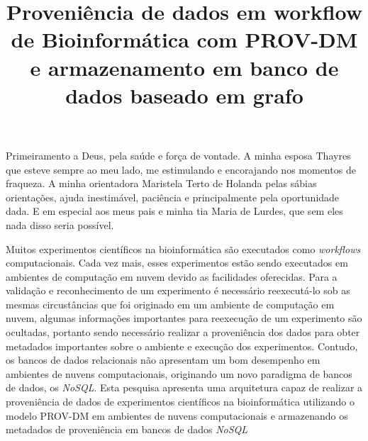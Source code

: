 \documentclass[mestrado]{unb-cic}
\title{Proveniência de dados em workflow de Bioinformática
  com PROV-DM e armazenamento em banco de dados baseado em grafo}
\begin{document}
\maketitle

\pretextual

\begin{agradecimentos}
Primeiramento a Deus, pela saúde e força de vontade. A minha esposa
Thayres que esteve sempre ao meu lado, me estimulando e encorajando
nos momentos de fraqueza. A minha orientadora \prof[a] \dr[a]
Maristela Terto de Holanda pelas sábias orientações, ajuda
inestimável, paciência e principalmente pela oportunidade
dada. E em especial aos meus pais e minha tia Maria de Lurdes, que sem
eles nada disso seria possível.

\end{agradecimentos}

\begin{resumo}
Muitos experimentos científicos na bioinformática são executados como
\textit{workflows} computacionais. Cada vez mais, esses experimentos estão sendo
executados em ambientes de computação em nuvem devido as facilidades
oferecidas. Para a validação e reconhecimento de um experimento é
necessário reexecutá-lo sob as mesmas circustâncias que foi originado
em um ambiente de computação em nuvem, algumas informações
importantes para reexecução de um experimento são ocultadas, portanto
sendo necessário realizar a proveniência dos dados para obter
metadados importantes sobre o ambiente e execução dos
experimentos. Contudo, os bancos de dados relacionais não apresentam
um bom desempenho em ambientes de nuvens computacionais, originando um novo paradigma de
bancos de dados, os \textit{NoSQL}. Esta pesquisa apresenta uma
arquitetura capaz de realizar a proveniência de dados de experimentos
científicos na bioinformática utilizando o modelo PROV-DM em ambientes
de nuvens computacionais e armazenando os metadados de proveniência em
bancos de dados \textit{NoSQL}

\end{resumo}


\end{document}
